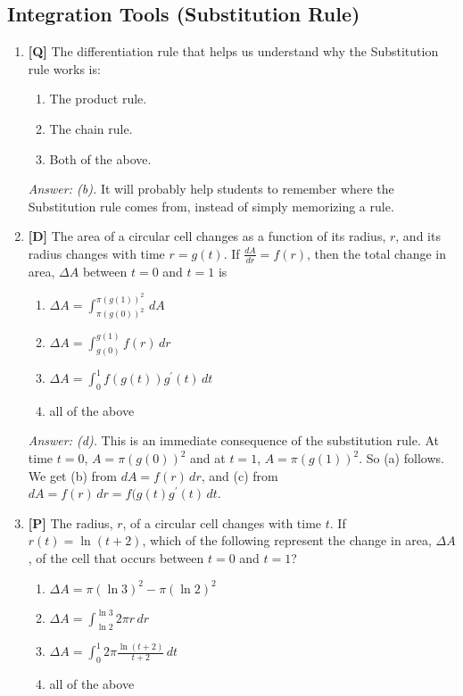 \documentclass[12pt]{article}
\begin{document}
\subsection{Integration Tools (Substitution Rule)}

\begin{enumerate}

\item {\bf [Q]}
The differentiation rule that helps us understand why the
Substitution rule works is:

\begin{enumerate}
\item The product rule.
\item The chain rule.
\item Both of the above.
\end{enumerate}

{\it Answer: (b).} It will probably help students to remember
where the Substitution rule comes from, instead of simply
memorizing a rule. 

\bigskip

\item {\bf [D]} The area of a circular cell changes as a function of its radius, $r$, 
and its radius changes with time $r=g(t)$. If $\displaystyle{\frac{dA}{dr}=f(r)}$, then the 
total change in area, $\Delta A$ between $t=0$ and $t=1$ is
\begin{enumerate}
\item $\displaystyle{\Delta A=\int_{\pi (g(0))^2}^{\pi (g(1))^2}\, dA}$
\item $\displaystyle{\Delta A=\int_{g(0)}^{g(1)} {f(r)} \, dr}$
\item $\displaystyle{\Delta A=\int_0^1 {f(g(t))g^{\prime}(t)}\, dt}$
\item all of the above
\end{enumerate}

{\it Answer: (d).} This is an immediate consequence of the substitution rule. At time $t=0$, $A=\pi (g(0))^2$ and at $t=1$, $A=\pi (g(1))^2$. 
So (a) follows. We get (b) from $dA= f(r)\, dr$, and (c) from $dA= f(r)\, dr=f(g(t) g^{\prime}(t) \, dt$.

\bigskip

\item {\bf [P]} The radius, $r$, of a circular cell changes with time $t$. If $r(t)=\ln (t+2)$, 
which of the following represent the change in area, $\Delta A$, of the cell that occurs 
between $t=0$ and $t=1$?
\begin{enumerate}
\item $\displaystyle{\Delta A=\pi (\ln 3)^2- \pi (\ln 2)^2}$
\item $\displaystyle{\Delta A=\int_{\ln 2}^{\ln 3} {2\pi r} \, dr}$
\item $\displaystyle{\Delta A=\int_0^1 {2\pi \frac{\ln (t+2)}{t+2}} \, dt}$
\item all of the above
\end{enumerate}


\end{enumerate}
\end{document}
